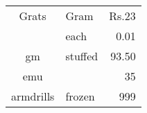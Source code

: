 \documentclass[12pt]{article}
\begin{document}
\begin{tabular}{||c|l|r|} \hline
Grats & Gram & Rs.23 \\ \cline{2-3}
& each & 0.01 \\ \hline
gm & stuffed & 93.50 \\ \cline{1-1} \cline{3-3}
emu &  & 35 \\ \hline
armdrills & frozen & 999 \\ \hline
\end{tabular}
\end{document}
